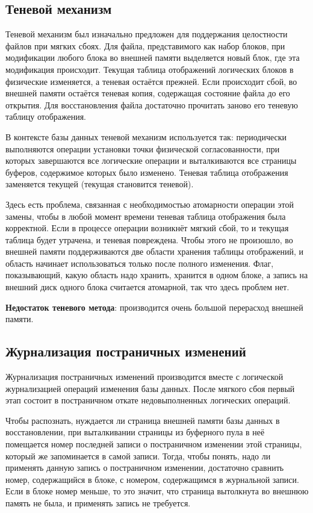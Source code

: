 \documentclass[a4paper,12pt]{article}
\begin{document}
\subsection{Теневой механизм}

Теневой механизм был изначально предложен для поддержания целостности файлов при мягких сбоях. Для файла, представимого как набор блоков, при модификации любого блока во внешней памяти выделяется новый блок, где эта модификация происходит. Текущая таблица отображений логических блоков в физические изменяется, а теневая остаётся прежней. Если происходит сбой, во внешней памяти остаётся теневая копия, содержащая состояние файла до его открытия. Для восстановления файла достаточно прочитать заново его теневую таблицу отображения.

В контексте базы данных теневой механизм используется так: периодически выполняются операции установки точки физической согласованности, при которых завершаются все логические операции и выталкиваются все страницы буферов, содержимое которых было изменено. Теневая таблица отображения заменяется текущей (текущая становится теневой).

Здесь есть проблема, связанная с необходимостью атомарности операции этой замены, чтобы в любой момент времени теневая таблица отображения была корректной. Если в процессе операции возникнёт мягкий сбой, то и текущая таблица будет утрачена, и теневая повреждена. Чтобы этого не произошло, во внешней памяти поддерживаются две области хранения таблицы отображений, и область начинает использоваться только после полного изменения. Флаг, показывающий, какую область надо хранить, хранится в одном блоке, а запись на внешний диск одного блока считается атомарной, так что здесь проблем нет.

\textbf{Недостаток теневого метода}: производится очень большой перерасход внешней памяти.

\subsection{Журнализация постраничных изменений}

Журнализация постраничных изменений производится вместе с логической журнализацией операций изменения базы данных. После мягкого сбоя первый этап состоит в постраничном откате недовыполненных логических операций.

Чтобы распознать, нуждается ли страница внешней памяти базы данных в восстановлении, при выталкивании страницы из буферного пула в неё помещается номер последней записи о постраничном изменении этой страницы, который же запоминается в самой записи. Тогда, чтобы понять, надо ли применять данную запись о постраничном изменении, достаточно сравнить номер, содержащийся в блоке, с номером, содержащимся в журнальной записи. Если в блоке номер меньше, то это значит, что страница вытолкнута во внешнюю память не была, и применять запись не требуется.
\end{document}

